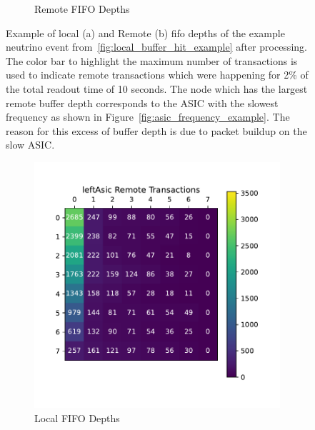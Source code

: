 \begin{figure}
\begin{subfigure}{.5\textwidth}
  \caption{Remote FIFO Depths}
\end{subfigure}
\caption{Example of local (a) and Remote (b) fifo depths of the example neutrino event from~\ref{fig:local_buffer_hit_example} after processing. 
The color bar to highlight the maximum number of transactions is used to indicate remote transactions which were happening for 2\% of the total readout time of 10 seconds.
The node which has the largest remote buffer depth corresponds to the ASIC with the slowest frequency as shown in Figure~\ref{fig:asic_frequency_example}.
The reason for this excess of buffer depth is due to packet buildup on the slow ASIC.
}
\label{fig:snake_example_neutrino}
\end{figure}


\begin{figure}
\centering
\begin{subfigure}{.5\textwidth}
  \centering
  \includegraphics[width=\textwidth]{images/left_asic_trans.pdf}
  \caption{Local FIFO Depths}
\end{subfigure}%
\begin{subfigure}{.5\textwidth}
  \centering

\end{subfigure}
\end{figure}
